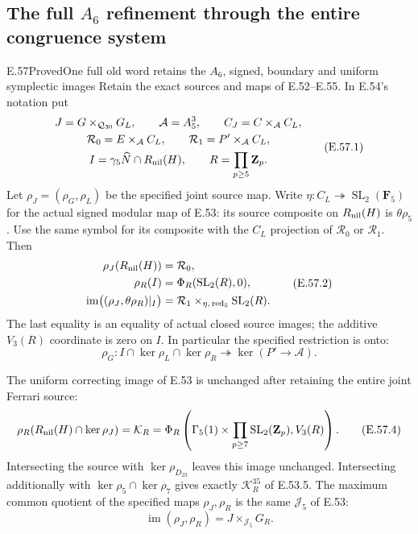 \subsection{The full $A_6$ refinement through the entire congruence system}

\begin{statement}{E.57}{Proved}{One full old word retains the $A_6$, signed, boundary and uniform symplectic images}
Retain the exact sources and maps of E.52--E.55.  In
E.54's notation put
\[
 \begin{gathered}
 J=G\times_{\mathcal Q_{30}}G_L,
 \qquad \mathcal A=A_5^3,\qquad
 C_J=C\times_{\mathcal A}C_L,\\
 \mathcal R_0=E\times_{\mathcal A}C_L,
 \qquad \mathcal R_1=P'\times_{\mathcal A}C_L,\\
 I=\gamma_5\widehat N\cap R_{\rm nil}(H),
 \qquad R=\prod_{p\ge5}\mathbf Z_p.
 \end{gathered}
 \tag{E.57.1}
\]
Let $\rho_J=(\rho_G,\rho_L)$ be the specified joint source map.
Write $\eta:C_L\twoheadrightarrow\operatorname{SL}_2(\mathbf F_5)$
for the actual signed modular map of E.53: its source
composite on $R_{\rm nil}(H)$ is $\theta\rho_5$.
Use the same symbol for its composite with the $C_L$
projection of $\mathcal R_0$ or $\mathcal R_1$.
Then
\[
 \begin{split}
 \rho_J(R_{\rm nil}(H))&=\mathcal R_0,\\
 \rho_R(I)&=\Phi_R(\operatorname{SL}_2(R),0),\\
 \operatorname{im}\bigl((\rho_J,\theta\rho_R)|_I\bigr)
   &=\mathcal R_1\times_{\eta,\,\mathrm{red}_5}
                                      \operatorname{SL}_2(R).
 \end{split}
 \tag{E.57.2}
\]
The last equality is an equality of actual closed source
images; the additive $V_3(R)$ coordinate is zero on $I$.
In particular the specified restriction is onto:
\[
 \rho_G:
 I\cap\ker\rho_L\cap\ker\rho_R
          \twoheadrightarrow\ker(P'\longrightarrow\mathcal A).
 \tag{E.57.3}
\]

The uniform correcting image of E.53 is unchanged after
retaining the entire joint Ferrari source:
\[
 \rho_R(R_{\rm nil}(H)\cap\ker\rho_J)
       =\mathcal K_R
       =\Phi_R\left(
          \Gamma_5(1)\times\prod_{p\ge7}\operatorname{SL}_2(\mathbf Z_p),
                                                   V_3(R)\right).
 \tag{E.57.4}
\]
Intersecting the source with $\ker\rho_{D_{23}}$ leaves
this image unchanged.  Intersecting additionally with
$\ker\rho_5\cap\ker\rho_7$ gives exactly
$\mathcal K_R^{35}$ of E.53.5.
The maximum common quotient of the specified maps
$\rho_J,\rho_R$ is the same $\mathcal J_5$ of E.53:
\[
        \operatorname{im}(\rho_J,\rho_R)
                    =J\times_{\mathcal J_5}G_R.
 \tag{E.57.5}
\]


\end{statement}
